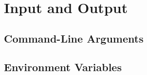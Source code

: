 \chapter{Input and Output}

\section{Command-Line Arguments}
\csharpsubsection{\csharp}

\section{Environment Variables}
\csharpsubsection{\csharp}

